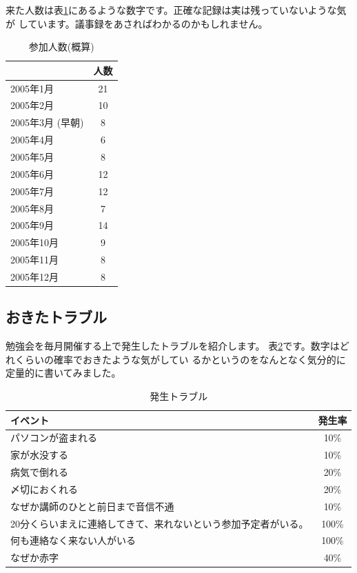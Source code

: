 \documentclass[mingoth,a4paper]{jsarticle}
\newcommand{\tbref}[1]{表\ref{#1}}
\begin{document}
来た人数は\tbref{tab:count}にあるような数字です。正確な記録は実は残っていないような気が
しています。議事録をあさればわかるのかもしれません。

\begin{table}[ht]
 \caption{参加人数(概算)}\label{tab:count}
 \begin{center}
  \begin{tabular}{|l|c|}
   & 人数 \\
 \hline
   2005年1月 & 21 \\
   2005年2月 & 10 \\
   2005年3月 (早朝)& 8\\
   2005年4月 & 6\\
   2005年5月 & 8\\
   2005年6月 & 12\\
   2005年7月 & 12\\
   2005年8月 & 7\\
   2005年9月 & 14\\
   2005年10月 & 9\\
   2005年11月 & 8\\
   2005年12月 & 8 \\
  \end{tabular}
 \end{center}
\end{table}


\subsection{おきたトラブル}

勉強会を毎月開催する上で発生したトラブルを紹介します。
\tbref{tab:trouble}です。数字はどれくらいの確率でおきたような気がしてい
るかというのをなんとなく気分的に定量的に書いてみました。

\begin{table}[ht]
 \caption{発生トラブル}\label{tab:trouble}
 \begin{center}
  \begin{tabular}{|l|c|}
   イベント & 発生率 \\
   \hline
   パソコンが盗まれる &  10\%\\
   家が水没する &  10\%\\
   病気で倒れる &  20\%\\
   〆切におくれる &  20\%\\
   なぜか講師のひとと前日まで音信不通 &  10\%\\
   20分くらいまえに連絡してきて、来れないという参加予定者がいる。&  100\%\\
   何も連絡なく来ない人がいる &  100\%\\
   なぜか赤字 &  40\%\\
  \end{tabular}
 \end{center}
\end{table}
\end{document}
